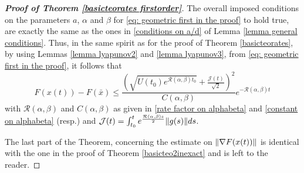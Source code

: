 \documentclass[reqno]{amsart}
\theoremstyle{plain}
\theoremstyle{definition}
\theoremstyle{remark}
\DeclarePairedDelimiter{\norm}{\lVert}{\rVert}	%
\newcommand{\Jb}{\mathcal{J}}
\newcommand{\Rb}{\mathcal{R}}
\begin{document}
\begin{proof}[\textbf{Proof of Theorem \ref{basicteorates firstorder}}]
The overall imposed conditions on the parameters $a$, $\alpha$ and $\beta$ for \eqref{eq: geometric first in the proof} to hold true, are exactly the same as the ones in \eqref{conditions on a/d} of Lemma \ref{lemma general conditions}. Thus, in the same spirit as for the proof of Theorem \ref{basicteorates}, by using Lemmas \ref{lemma lyapunov2} and \ref{lemma lyapunov3}, from \eqref{eq: geometric first in the proof}, it follows that
\begin{equation}\label{bound on F in the proof of Thm3}
	F(x(t))- F(\bar{x}) \leq \frac{\left(\sqrt{U(t_{0})e^{\Rb(\alpha,\beta)t_{0}}} + \frac{\Jb(t)}{\sqrt{2}}\right)^{2}}{C(\alpha,\beta)}e^{-\Rb(\alpha,\beta)t}
\end{equation} 
with $\Rb(\alpha,\beta)$ and $C(\alpha,\beta)$ as given in \eqref{rate factor on alphabeta} and \eqref{constant on alphabeta} (resp.) and $\Jb(t)=\int_{t_{0}}^{t}e^{\frac{\Rb(\alpha,\beta)s}{2}}\norm{g(s)}ds$.

The last part of the Theorem, concerning the estimate on $\norm{\nabla F(x(t))}$ is identical with the one in the proof of Theorem \ref{basicteo2inexact} and is left to the reader.



\end{proof}
\end{document}
